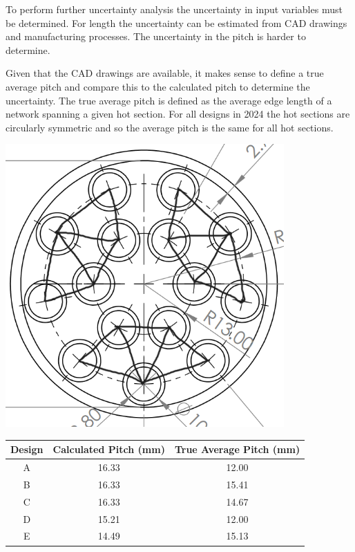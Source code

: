 \documentclass{article}
\begin{document}
To perform further uncertainty analysis the uncertainty in input variables must be determined.
For length the uncertainty can be estimated from CAD drawings and manufacturing processes.
The uncertainty in the pitch is harder to determine.

Given that the CAD drawings are available, it makes sense to define a true average pitch and compare this to the calculated pitch to determine the uncertainty.
The true average pitch is defined as the average edge length of a network spanning a given hot section.
For all designs in 2024 the hot sections are circularly symmetric and so the average pitch is the same for all hot sections.

\begin{minipage}[t]{0.29\textwidth}
    \centering
    \includegraphics[width=0.8\textwidth]{tube_network.png}
    \label{fig:tube_network}
\end{minipage}
\begin{minipage}[t]{0.69\textwidth}
    \centering
    \begin{tabular}{|c|c|c|}
        \hline
        Design & Calculated Pitch (mm) & True Average Pitch (mm) \\
        \hline
        A & 16.33 & 12.00 \\
        B & 16.33 & 15.41 \\
        C & 16.33 & 14.67 \\
        D & 15.21 & 12.00 \\
        E & 14.49 & 15.13 \\
        \hline
    \end{tabular}
    \label{tab:pitch_comparison}
\end{minipage}
\end{document}
